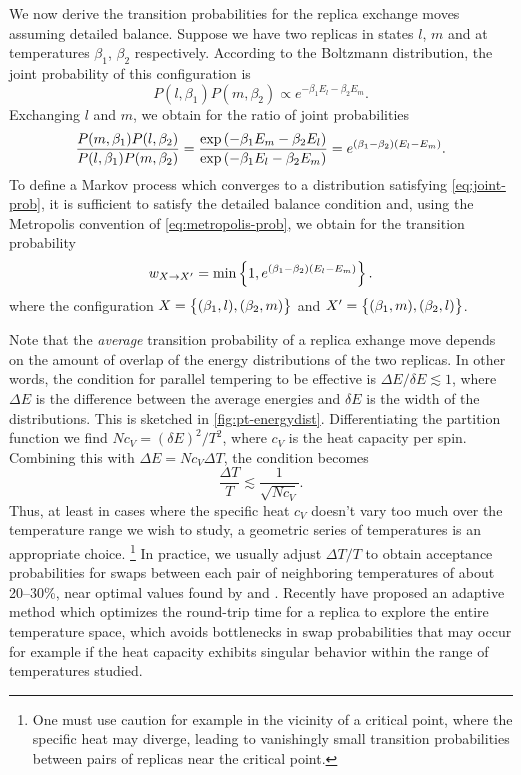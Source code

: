We now derive the transition probabilities for the replica exchange moves
assuming detailed balance. Suppose we have two replicas in states $l$, $m$ and
at temperatures $\beta_1$, $\beta_2$ respectively. According to the Boltzmann
distribution, the joint probability of this configuration is
\begin{equation}
  P(l,\beta_1) P(m,\beta_2) \propto
  e^{-\beta_1 E_l - \beta_2 E_m}.
  \label{eq:joint-prob}
\end{equation}
Exchanging $l$ and $m$, we obtain for the ratio of joint probabilities
\begin{equation}
  \frac{P(m,\beta_1) P(l,\beta_2)}
       {P(l,\beta_1) P(m,\beta_2)} =
  \frac{\exp\left(-\beta_1 E_m - \beta_2 E_l\right)}
       {\exp\left(-\beta_1 E_l - \beta_2 E_m\right)} =
  e^{(\beta_1-\beta_2)(E_l-E_m)}.
\end{equation}
To define a Markov process which converges to a distribution satisfying
\cref{eq:joint-prob}, it is sufficient to satisfy the detailed balance
condition and, using the Metropolis convention of \cref{eq:metropolis-prob}, we
obtain for the transition probability
\begin{equation}
  w_{X \to X^{\prime}}
  = \min\cbr{1, e^{(\beta_1-\beta_2)(E_l-E_m)}}.
\end{equation}
where the configuration
$X=\cbr{(\beta_1,l),(\beta_2,m)}$ and
$X^{\prime}=\cbr{(\beta_1,m),(\beta_2,l)}$.

Note that the \emph{average} transition probability of a replica exhange move
depends on the amount of overlap of the energy distributions of the two
replicas. In other words, the condition for parallel tempering to be effective
is $\Delta E / \delta E \lesssim 1$, where $\Delta E$ is the difference between
the average energies and $\delta E$ is the width of the distributions. This is
sketched in \cref{fig:pt-energydist}. Differentiating the partition function we
find $N c_V = (\delta E)^2 / T^2$, where $c_V$ is the heat capacity per spin.
Combining this with $\Delta E = N c_V \Delta T$, the condition becomes
\begin{equation}
  \frac{\Delta T}{T} \lesssim \frac{1}{\sqrt{N c_V}}.
\end{equation}
Thus, at least in cases where the specific heat $c_V$ doesn't vary too much
over the temperature range we wish to study, a geometric series of temperatures
is an appropriate choice.%
\footnote{%
  One must use caution for example in the vicinity of a critical point, where
  the specific heat may diverge, leading to vanishingly small transition
  probabilities between pairs of replicas near the critical point.
}
In practice, we usually adjust $\Delta T/T$ to obtain acceptance probabilities
for swaps between each pair of neighboring temperatures of about 20--30\%, near
optimal values found by \textcite{rathore2005optimal} and
\textcite{kone2005selection}. Recently \textcite{katzgraber2006feedback} have
proposed an adaptive method which optimizes the round-trip time for a replica
to explore the entire temperature space, which avoids bottlenecks in swap
probabilities that may occur for example if the heat capacity exhibits singular
behavior within the range of temperatures studied.


